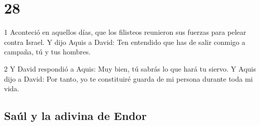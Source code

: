 \chapter{28}


\par 1 Aconteció en aquellos días, que los filisteos reunieron sus fuerzas para pelear contra Israel. Y dijo Aquis a David: Ten entendido que has de salir conmigo a campaña, tú y tus hombres.
\par 2 Y David respondió a Aquis: Muy bien, tú sabrás lo que hará tu siervo. Y Aquis dijo a David: Por tanto, yo te constituiré guarda de mi persona durante toda mi vida.

\section*{Saúl y la adivina de Endor}

